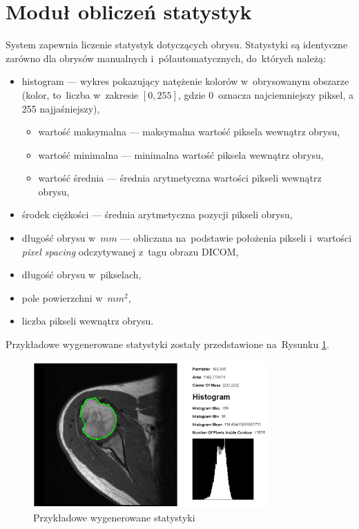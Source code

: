 \documentclass[a4paper,11pt,twoside,openright]{report}
\theoremstyle{definition}
\begin{document}
\section {Moduł obliczeń statystyk}

System zapewnia liczenie statystyk dotyczących obrysu. Statystyki są identyczne
zarówno dla obrysów manualnych i~półautomatycznych, do~których należą:

\begin{itemize}[noitemsep]
\item histogram --- wykres pokazujący natężenie kolorów w~obrysowanym obszarze
(kolor, to~liczba w~zakresie $[0,255]$, gdzie 0~oznacza najciemniejszy piksel,
a 255 najjaśniejszy),
\begin{itemize}[noitemsep]
\item wartość maksymalna --- maksymalna wartość piksela wewnątrz obrysu,
\item wartość minimalna --- minimalna wartość piksela wewnątrz obrysu,
\item wartość średnia --- średnia arytmetyczna wartości pikseli wewnątrz obrysu,
\end{itemize}
\item środek ciężkości --- średnia arytmetyczna pozycji pikseli obrysu,
\item długość obrysu w~$mm$ --- obliczana na~podstawie położenia pikseli i~wartości \textit{pixel spacing}
odczytywanej z~tagu obrazu DICOM,
\item długość obrysu w~pikselach,
\item pole powierzchni w~$mm^2$,
\item liczba pikseli wewnątrz obrysu.
\end{itemize}

Przykładowe wygenerowane statystyki zostały przedstawione na~Rysunku \ref{fig:107b}.

\begin{figure}[h!]
	\center
	\includegraphics[width=0.8\textwidth]{107}
	\caption{Przykładowe wygenerowane statystyki}
    	\label{fig:107b}
\end{figure}
\end{document}
